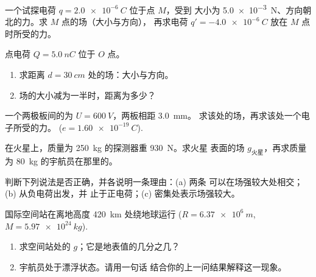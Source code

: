 \begin{exercise}[$\star$]\label{exo:g11:electric-gravitational-fields:1}
一个试探电荷 $q = \qty{+2.0e-6}{C}$ 位于点 $M$，受到
大小为 \qty{5.0e-3}{N}、方向朝北的力。求 $M$ 点的场（大小与方向），
再求电荷 $q' = \qty{-4.0e-6}{C}$ 放在 $M$ 点时所受的力。
\end{exercise}

\begin{exercise}[$\star$]\label{exo:g11:electric-gravitational-fields:2}
点电荷 $Q = \qty{+5.0}{nC}$ 位于 $O$ 点。
\begin{enumerate}
  \item 求距离 $d = \qty{30}{cm}$ 处的场：大小与方向。
  \item 场的大小减为一半时，距离为多少？
\end{enumerate}
\end{exercise}

\begin{exercise}[$\star$]\label{exo:g11:electric-gravitational-fields:3}
一个两极板间的为 $U = \qty{600}{V}$，两板相距 \qty{3.0}{mm}。
求该处的场，再求该处一个电子所受的力。
($e = \qty{1.60e-19}{C}$).
\end{exercise}

\begin{exercise}[$\star$]\label{exo:g11:electric-gravitational-fields:4}
在火星上，质量为 \qty{250}{kg} 的探测器重 \qty{930}{N}。求火星
表面的场 $g_{\text{火星}}$，再求质量为 \qty{80}{kg}
的宇航员在那里的。
\end{exercise}

\begin{exercise}[$\star$]\label{exo:g11:electric-gravitational-fields:5}
判断下列说法是否正确，并各说明一条理由：(a) 两条
可以在场强较大处相交；(b) 从负电荷出发，并
止于正电荷；(c) 密集处表示场强较大。
\end{exercise}

\begin{exercise}[$\star\star$]\label{exo:g11:electric-gravitational-fields:6}
国际空间站在离地高度 \qty{420}{km} 处绕地球运行
($R = \qty{6.37e6}{m}$, $M = \qty{5.97e24}{kg}$).
\begin{enumerate}
  \item 求空间站处的 $g$；它是地表值的几分之几？
  \item 宇航员处于漂浮状态。请用一句话
        结合你的上一问结果解释这一现象。
\end{enumerate}
\end{exercise}

